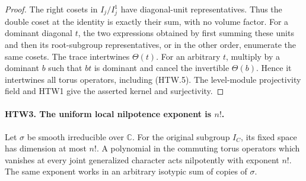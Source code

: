 \begin{proof}
The right cosets in \(I_j/I_j^1\) have diagonal-unit
representatives.  Thus the double coset at the identity
is exactly their sum, with no volume factor.  For a
dominant diagonal \(t\), the two expressions obtained
by first summing these units and then its root-subgroup
representatives, or in the other order, enumerate the
same cosets.  The trace intertwines \(\Theta(t)\).
For an arbitrary \(t\), multiply by a dominant \(b\)
such that \(bt\) is dominant and cancel the invertible
\(\Theta(b)\).  Hence it intertwines all torus operators,
including (HTW.5).  The level-module projectivity field
and HTW1 give the asserted kernel and surjectivity.
\end{proof}

\paragraph{HTW3. The uniform local nilpotence exponent is \(n!\).}
\label{claim:HTW3}
Let \(\sigma\) be smooth irreducible over \(\mathbb C\).
For the original subgroup \(I_C\), its fixed space has
dimension at most \(n!\).  A polynomial in the commuting
torus operators which vanishes at every joint generalized
character acts nilpotently with exponent \(n!\).
The same exponent works in an arbitrary isotypic sum of
copies of \(\sigma\).
